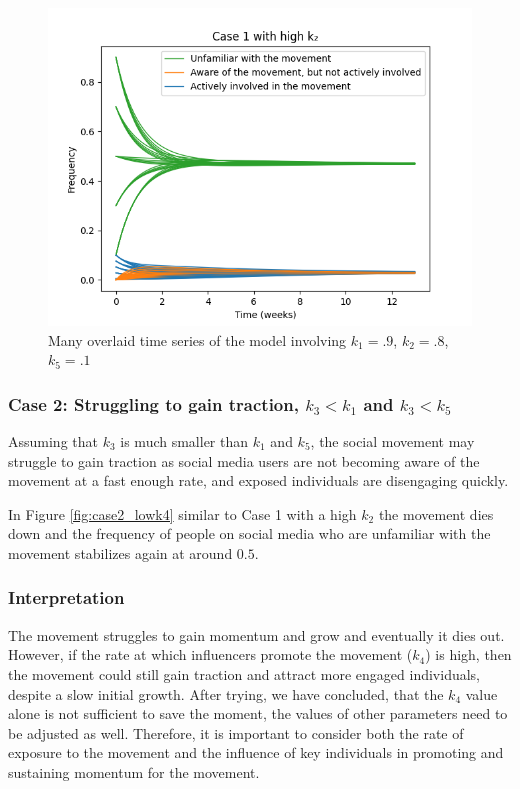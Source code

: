 \documentclass{article}
\begin{document}
    \begin{figure}[H]

        \centering
        \includegraphics[width=\textwidth]{simulation/plots/case1-highk2.png}   
        \caption{Many overlaid time series of the model involving \mbox{$k_1=.9$}, \mbox{$k_2=.8$}, \mbox{$k_5=.1$}}
        \label{fig:case1_highk2}
    \end{figure}


    \subsubsection*{Case 2: Struggling to gain traction, $k_3 < k_1$ and $k_3 < k_5$}
    Assuming that $k_3$ is much smaller than $k_1$ and $k_5$, the social movement may struggle to gain traction as social media users are not becoming aware of the movement at a fast enough rate, and exposed individuals are disengaging quickly. 

    In Figure \ref{fig:case2_lowk4} similar to Case 1 with a high $k_2$ the movement dies down and the frequency of people on social media who are unfamiliar with the movement stabilizes again at around $0.5$.
    
    \subsubsection*{Interpretation} The movement  struggles to gain momentum and grow and eventually it dies out. However, if the rate at which influencers promote the movement ($k_4$) is high, then the movement could still gain traction and attract more engaged individuals, despite a slow initial growth. After trying, we have concluded, that the $k_4$ value alone is not sufficient to save the moment, the values of other parameters need to be adjusted as well. Therefore, it is important to consider both the rate of exposure to the movement and the influence of key individuals in promoting and sustaining momentum for the movement.
    
\end{document}
